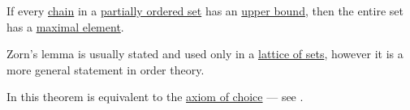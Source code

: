 \begin{theorem}\label{thm:zorns_lemma}
  If every \hyperref[def:partially_ordered_set_chain_and_antichain]{chain} in a \hyperref[def:partially_ordered_set]{partially ordered set} has an \hyperref[def:partially_ordered_set_extremal_points/upper_and_lower_bounds]{upper bound}, then the entire set has a \hyperref[def:partially_ordered_set_extremal_points/maximal_and_minimal_element]{maximal element}.

  Zorn's lemma is usually stated and used only in a \hyperref[thm:boolean_algebra_of_subsets]{lattice of sets}, however it is a more general statement in order theory.

  In \hyperref[def:zfc]{} this theorem is equivalent to the \hyperref[def:zfc/choice]{axiom of choice} --- see .
\end{theorem}
